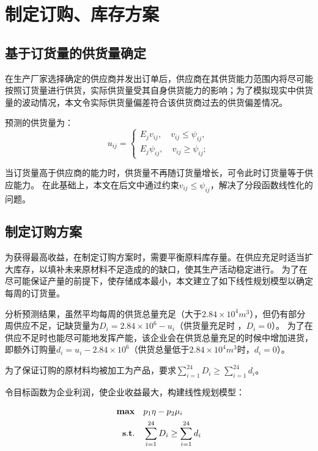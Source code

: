 
\section{制定订购、库存方案}
\subsection{基于订货量的供货量确定}

在生产厂家选择确定的供应商并发出订单后，供应商在其供货能力范围内将尽可能按照订货量进行供货，实际供货量受其自身供货能力的影响；为了模拟现实中供货量的波动情况，本文令实际供货量偏差符合该供货商过去的供货偏差情况。

预测的供货量为：
\begin{equation}
    u_{i j}=\left\{\begin{array}{l}
E_{j} v_{i j}, \quad v_{i j} \leq \psi_{i j}, \\
E_{j} \psi_{i j}, \quad v_{i j} \geq {\psi}_{i j};
\end{array}\right.
\end{equation}

当订货量高于供应商的能力时，供货量不再随订货量增长，可令此时订货量等于供应能力。
在此基础上，本文在后文中通过约束$v_{i j} \leq \psi_{i j}$，解决了分段函数线性化的问题。


\subsection{制定订购方案}

为获得最高收益，在制定订购方案时，需要平衡原料库存量。在供应充足时适当扩大库存，以填补未来原材料不足造成的的缺口，使其生产活动稳定进行。
为了在尽可能保证产量的前提下，使存储成本最小，本文建立了如下线性规划模型以确定每周的订货量。

分析预测结果，虽然平均每周的供货总量充足（大于$2.84 \times 10^4 m^3$），但仍有部分周供应不足，记缺货量为$D_i=2.84 \times10^6-u_i$（供货量充足时 ，$D_i=0$）。
为了在供应不足时也能尽可能地发挥产能，该企业会在供货总量充足的时候中增加进货，即额外订购量$d_i=u_i-2.84 \times 10^6$（供货总量低于$2.84 \times 10^4 m^3$时，$d_i=0$）。

为了保证订购的原材料均被加工为产品，要求$\sum_{i=1}^{24}D_i \geq \sum_{i=1}^{24}d_i$。


令目标函数为企业利润，使企业收益最大，构建线性规划模型：

\begin{equation}
\begin{split}
{\bf max}\quad &p_1\eta-p_2\mu_i \\
{\bf s.t.}\quad &\sum_{i=1}^{24}D_i \geq \sum_{i=1}^{24}d_i
\end{split}
\end{equation}

